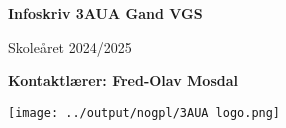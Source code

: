 \begin{titlepage}
   \begin{center}
       \vspace*{1cm}

       \textbf{Infoskriv 3AUA Gand VGS}

       \vspace{0.5cm}
        Skoleåret 2024/2025
            
       \vspace{1.5cm}

       \textbf{Kontaktlærer: Fred-Olav Mosdal}

       \vfill
            
            
     
       \texttt{[image: ../output/nogpl/3AUA logo.png]}
    \vfill        
            
   \end{center}
\end{titlepage}
